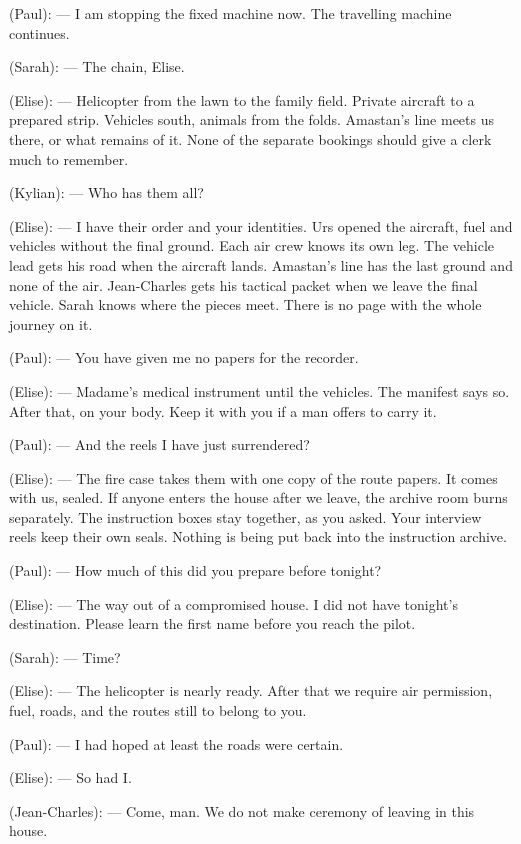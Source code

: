 \begin{room}
(Paul): --- I am stopping the fixed machine now. The travelling machine continues.

\centerline{}

(Sarah): --- The chain, Elise.

(Elise): --- Helicopter from the lawn to the family field. Private aircraft to a prepared strip. Vehicles south, animals from the folds. Amastan's line meets us there, or what remains of it. None of the separate bookings should give a clerk much to remember.

(Kylian): --- Who has them all?

(Elise): --- I have their order and your identities. Urs opened the aircraft, fuel and vehicles without the final ground. Each air crew knows its own leg. The vehicle lead gets his road when the aircraft lands. Amastan's line has the last ground and none of the air. Jean-Charles gets his tactical packet when we leave the final vehicle. Sarah knows where the pieces meet. There is no page with the whole journey on it.

(Paul): --- You have given me no papers for the recorder.

(Elise): --- Madame's medical instrument until the vehicles. The manifest says so. After that, on your body. Keep it with you if a man offers to carry it.

(Paul): --- And the reels I have just surrendered?

(Elise): --- The fire case takes them with one copy of the route papers. It comes with us, sealed. If anyone enters the house after we leave, the archive room burns separately. The instruction boxes stay together, as you asked. Your interview reels keep their own seals. Nothing is being put back into the instruction archive.

(Paul): --- How much of this did you prepare before tonight?

(Elise): --- The way out of a compromised house. I did not have tonight's destination. Please learn the first name before you reach the pilot.

(Sarah): --- Time?

(Elise): --- The helicopter is nearly ready. After that we require air permission, fuel, roads, and the routes still to belong to you.

(Paul): --- I had hoped at least the roads were certain.

(Elise): --- So had I.

(Jean-Charles): --- Come, man. We do not make ceremony of leaving in this house.


\end{room}
